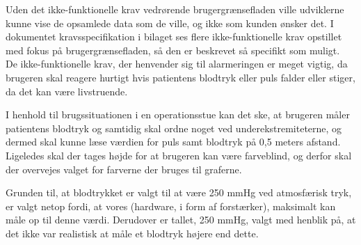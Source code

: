 Uden det ikke-funktionelle krav vedrørende brugergrænsefladen ville udviklerne kunne vise de opsamlede data som de ville, og ikke som kunden ønsker det. I dokumentet kravsspecifikation i bilaget ses flere ikke-funktionelle krav opstillet med fokus på brugergrænsefladen, så den er beskrevet så specifikt som muligt. \\


De ikke-funktionelle krav, der henvender sig til alarmeringen er meget vigtig, da brugeren skal reagere hurtigt hvis patientens blodtryk eller puls falder eller stiger, da det kan være livstruende.

I henhold til brugssituationen i en operationsstue kan det ske, at brugeren måler patientens blodtryk og samtidig skal ordne noget ved underekstremiteterne, og dermed skal kunne læse værdien for puls samt blodtryk på 0,5 meters afstand. Ligeledes skal der tages højde for at brugeren kan være farveblind, og derfor skal der overvejes valget for farverne der bruges til graferne.

Grunden til, at blodtrykket er valgt til at være 250 mmHg ved atmosfærisk tryk, er valgt netop fordi, at vores (hardware, i form af forstærker), maksimalt kan måle op til denne værdi. Derudover er tallet, 250 mmHg, valgt med henblik på, at det ikke var realistisk at måle et blodtryk højere end dette.\\